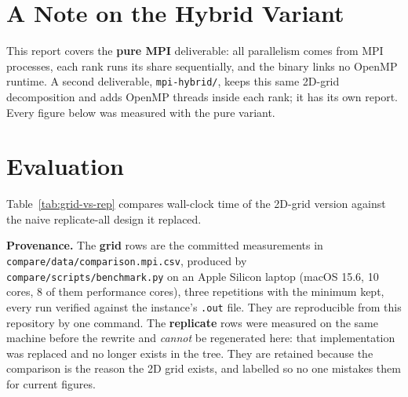 \documentclass[twocolumn]{article}
\begin{document}
    \section{A Note on the Hybrid Variant}\label{sec:hybrid}
    This report covers the \textbf{pure MPI} deliverable: all parallelism comes from MPI
    processes, each rank runs its share sequentially, and the binary links no OpenMP
    runtime. A second deliverable, \texttt{mpi-hybrid/}, keeps this same 2D-grid
    decomposition and adds OpenMP threads inside each rank; it has its own report. Every
    figure below was measured with the pure variant.


    \section{Evaluation}\label{sec:evaluation}
    Table~\ref{tab:grid-vs-rep} compares wall-clock time of the 2D-grid version against
    the naive replicate-all design it replaced.

    \textbf{Provenance.} The \textbf{grid} rows are the committed measurements in
    \texttt{compare/data/comparison.mpi.csv}, produced by
    \texttt{compare/scripts/benchmark.py} on an Apple Silicon laptop (macOS 15.6, 10
    cores, 8 of them performance cores), three repetitions with the minimum kept, every
    run verified against the instance's \texttt{.out} file. They are reproducible from
    this repository by one command. The \textbf{replicate} rows were measured on the same
    machine before the rewrite and \emph{cannot} be regenerated here: that implementation
    was replaced and no longer exists in the tree. They are retained because the
    comparison is the reason the 2D grid exists, and labelled so no one mistakes them for
    current figures.
\end{document}
